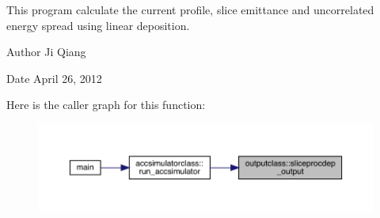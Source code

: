 This program calculate the current profile, slice emittance and uncorrelated energy spread using linear deposition. 

\begin{DoxyAuthor}{Author}
Ji Qiang 
\end{DoxyAuthor}
\begin{DoxyDate}{Date}
April 26, 2012 
\end{DoxyDate}
Here is the caller graph for this function\+:\nopagebreak
\begin{figure}[H]
\begin{center}
\leavevmode
\includegraphics[width=350pt]{namespaceoutputclass_aaba51e45761070d95883093a25e402c4_icgraph}
\end{center}
\end{figure}
